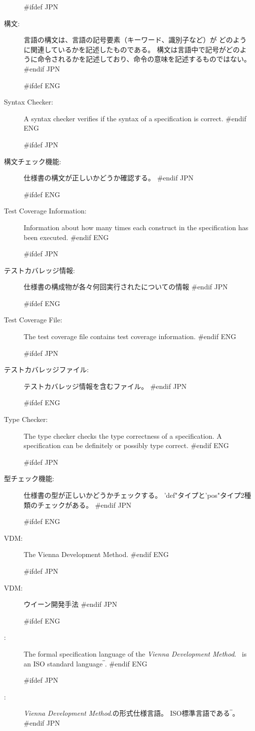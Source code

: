 \begin{description}
#ifdef JPN
\item[構文:] 言語の構文は、言語の記号要素（キーワード、識別子など）が
  どのように関連しているかを記述したものである。
  構文は言語中で記号がどのように命令されるかを記述しており、命令の意味を記述するものではない。
#endif JPN

#ifdef ENG
\item[Syntax Checker:] A syntax checker verifies if the syntax of a
  specification is correct.
#endif ENG

#ifdef JPN
\item[構文チェック機能:] 仕様書の構文が正しいかどうか確認する。
#endif JPN

#ifdef ENG
\item[Test Coverage Information:] Information about how many times
  each construct in the specification has been executed.
#endif ENG
  
#ifdef JPN
\item[テストカバレッジ情報:] 仕様書の構成物が各々何回実行されたについての情報
#endif JPN
  
#ifdef ENG
\item[Test Coverage File:] The test coverage file contains test
  coverage information.
#endif ENG
  
#ifdef JPN
\item[テストカバレッジファイル:] テストカバレッジ情報を含むファイル。
#endif JPN
  
#ifdef ENG
\item[Type Checker:] The type checker checks the type
  correctness of a specification. A specification can be definitely or
  possibly type correct.
#endif ENG

#ifdef JPN
\item[型チェック機能:] 仕様書の型が正しいかどうかチェックする。
  'def"タイプと'pos"タイプ2種類のチェックがある。
#endif JPN

#ifdef ENG
\item[VDM:] The Vienna Development Method.
#endif ENG

#ifdef JPN
\item[VDM:] ウイーン開発手法
#endif JPN

#ifdef ENG
\item[\vdmsl:] The formal specification language of the {\em Vienna
    Development Method}. \vdmsl\ is an ISO standard
  language‾\cite{ISOVDM96}. 
#endif ENG

#ifdef JPN
\item[\vdmsl:] {\em Vienna Development Method}.の形式仕様言語。
  ISO標準言語である‾\cite{ISOVDM96}。\\
#endif JPN


\end{description}
